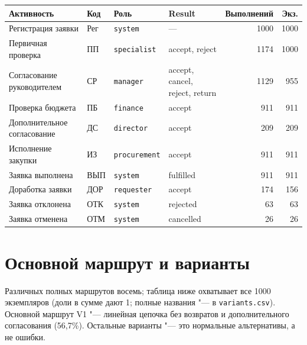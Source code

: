 \documentclass[11pt,a4paper]{article}
\begin{document}
\begin{center}\small
\begin{tabular}{@{}lllp{3.3cm}rr@{}}\toprule
Активность & Код & Роль & Result & Выполнений & Экз.\\\midrule
Регистрация заявки & Рег & \texttt{system} & --- & 1000 & 1000 \\
Первичная проверка & ПП & \texttt{specialist} & accept, reject & 1174 & 1000 \\
Согласование руководителем & СР & \texttt{manager} & accept, cancel, reject, return & 1129 & 955 \\
Проверка бюджета & ПБ & \texttt{finance} & accept & 911 & 911 \\
Дополнительное согласование & ДС & \texttt{director} & accept & 209 & 209 \\
Исполнение закупки & ИЗ & \texttt{procurement} & accept & 911 & 911 \\
Заявка выполнена & ВЫП & \texttt{system} & fulfilled & 911 & 911 \\
Доработка заявки & ДОР & \texttt{requester} & accept & 174 & 156 \\
Заявка отклонена & ОТК & \texttt{system} & rejected & 63 & 63 \\
Заявка отменена & ОТМ & \texttt{system} & cancelled & 26 & 26 \\
\bottomrule\end{tabular}
\end{center}

\section{Основной маршрут и варианты}
Различных полных маршрутов восемь; таблица ниже охватывает все 1000 экземпляров (доли в сумме дают 1; полные названия "--- в \texttt{variants.csv}). Основной маршрут V1 "--- линейная цепочка без возвратов и дополнительного согласования (56,7\%). Остальные варианты "--- это нормальные альтернативы, а не ошибки.
\end{document}
